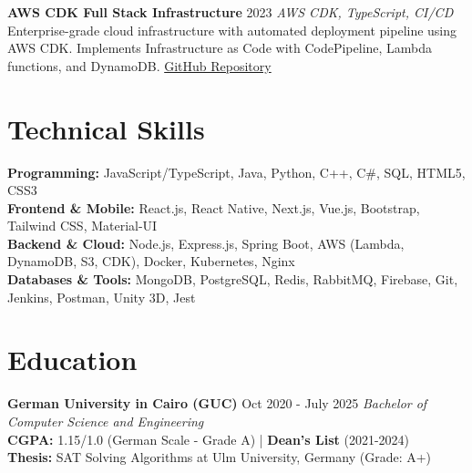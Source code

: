 \documentclass[8pt,a4paper]{article}
\newcommand{\cventry}[4]{%
    \textbf{#1} \hfill {\small\color{secondarycolor} #2} \hfill {\footnotesize\textit{#3}}\\
    #4
    \vspace{0.02em}
}
\newcommand{\skillsection}[2]{%
    \textbf{#1:} #2\\[-0.02em]
}
\begin{document}
\cventry{AWS CDK Full Stack Infrastructure}{2023}{AWS CDK, TypeScript, CI/CD}{
Enterprise-grade cloud infrastructure with automated deployment pipeline using AWS CDK. Implements Infrastructure as Code with CodePipeline, Lambda functions, and DynamoDB. \href{https://github.com/ramezlahzy/cdk_fullstack_app}{GitHub Repository}
}




\section{Technical Skills}

\skillsection{Programming}{JavaScript/TypeScript, Java, Python, C++, C\#, SQL, HTML5, CSS3}
\skillsection{Frontend \& Mobile}{React.js, React Native, Next.js, Vue.js, Bootstrap, Tailwind CSS, Material-UI}
\skillsection{Backend \& Cloud}{Node.js, Express.js, Spring Boot, AWS (Lambda, DynamoDB, S3, CDK), Docker, Kubernetes, Nginx}
\skillsection{Databases \& Tools}{MongoDB, PostgreSQL, Redis, RabbitMQ, Firebase, Git, Jenkins, Postman, Unity 3D, Jest}


\section{Education}

\cventry{German University in Cairo (GUC)}{Oct 2020 - July 2025}{Bachelor of Computer Science and Engineering}{
\textbf{CGPA:} 1.15/1.0 (German Scale - Grade A) | \textbf{Dean's List} (2021-2024) \\
\textbf{Thesis:} SAT Solving Algorithms at Ulm University, Germany (Grade: A+)
}
\end{document}
